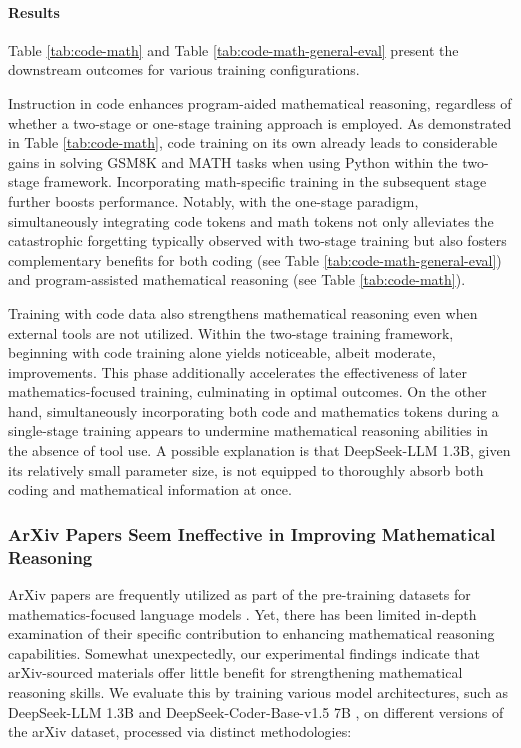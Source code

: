 \begin{itemize}[topsep=0pt]
\begin{itemize}[topsep=0pt]
\paragraph{Results}
Table \ref{tab:code-math} and Table \ref{tab:code-math-general-eval} present the downstream outcomes for various training configurations.

Instruction in code enhances program-aided mathematical reasoning, regardless of whether a two-stage or one-stage training approach is employed. As demonstrated in Table \ref{tab:code-math}, code training on its own already leads to considerable gains in solving GSM8K and MATH tasks when using Python within the two-stage framework. Incorporating math-specific training in the subsequent stage further boosts performance. Notably, with the one-stage paradigm, simultaneously integrating code tokens and math tokens not only alleviates the catastrophic forgetting typically observed with two-stage training but also fosters complementary benefits for both coding (see Table \ref{tab:code-math-general-eval}) and program-assisted mathematical reasoning (see Table \ref{tab:code-math}).

Training with code data also strengthens mathematical reasoning even when external tools are not utilized. Within the two-stage training framework, beginning with code training alone yields noticeable, albeit moderate, improvements. This phase additionally accelerates the effectiveness of later mathematics-focused training, culminating in optimal outcomes. On the other hand, simultaneously incorporating both code and mathematics tokens during a single-stage training appears to undermine mathematical reasoning abilities in the absence of tool use. A possible explanation is that DeepSeek-LLM 1.3B, given its relatively small parameter size, is not equipped to thoroughly absorb both coding and mathematical information at once.

\subsubsection{ArXiv Papers Seem Ineffective in Improving Mathematical Reasoning}

ArXiv papers are frequently utilized as part of the pre-training datasets for mathematics-focused language models \citep{minerva,gpt-f,llemma,mathpile}. Yet, there has been limited in-depth examination of their specific contribution to enhancing mathematical reasoning capabilities. Somewhat unexpectedly, our experimental findings indicate that arXiv-sourced materials offer little benefit for strengthening mathematical reasoning skills. We evaluate this by training various model architectures, such as DeepSeek-LLM 1.3B and DeepSeek-Coder-Base-v1.5 7B \citep{deepseek-coder}, on different versions of the arXiv dataset, processed via distinct methodologies:


\end{itemize}
\end{itemize}
